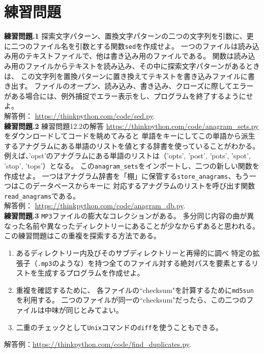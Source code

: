 \documentclass[a4j,12pt,makeidx]{jbook}
\newcommand{\tp}{\thechapter}
\begin{document}
\section{練習問題}
\noindent
{\bf 練習問題\tp.1} 探索文字パターン、置換文字パターンの二つの文字列を引数に、更に二つのファイル名を引数とする関数{\tt sed}を作成せよ。
一つのファイルは読み込み用のテキストファイルで、他は書き込み用のファイルである。
関数は読み込み用のファイルからテキストを読み込み、その中に探索文字パターンがあるときは、
この文字列を置換パターンに置き換えてテキストを書き込みファイルに書き出す。
ファイルのオープン、読み込み、書き込み、クローズに際してエラーがある場合には、例外捕捉でエラー表示をし、プログラムを終了するようにせよ。\\
解答例： \url{https://thinkpython.com/code/sed.py}.\\

\noindent
{\bf 練習問題\tp.2} 練習問題12.2の解答
\url{https://thinkpython.com/code/anagram_sets.py}
をダウンロードしてコードを眺めてみると
単語をキーにしてこの単語から派生するアナグラムにある単語のリストを値とする辞書を使っていることがわかる。
例えば、'opst'のアナグラムにある単語のリストは（'opts', 'post', 'pots', 'spot', 'stop', 'tops'）となる。
この{\tt anagram\_sets}をインポートし、二つの新しい関数を作成せよ。
一つはアナグラム辞書を「棚」に保管する{\tt store\_anagrams}、もう一つはこのデータベースからキーに
対応するアナグラムのリストを呼び出す関数{\tt read\_anagrams}である。 \\
解答例： \url{https://thinkpython.com/code/anagram_db.py}.\\

\noindent
{\bf 練習問題\tp.3} {\tt MP3}ファイルの膨大なコレクションがある。
多分同じ内容の曲が異なった名前や異なったディレクトリーにあることが少なからずあると思われる。
この練習問題はこの重複を探索する方法である。
\begin{enumerate}
\item あるディレクトリー内及びそのサブディレクトリーと再帰的に調べ
特定の拡張子（{\tt .mp3}のような）を持つ全てのファイル対する絶対パスを要素とするリストを生成するプログラムを作成せよ。
\item 重複を確認するために、
各ファイルの``checksum"を計算するために{\tt md5sun}を利用する。
二つのファイルが同一の``checksum"だったら、この二つのファイルは中味が同じとみてよい。
\item 二重のチェックとして{\tt Unix}コマンドの{\tt diff}を使うこともできる。 
\end{enumerate} 
解答例：\url{https://thinkpython.com/code/find_duplicates.py}. \\
%
\end{document}
